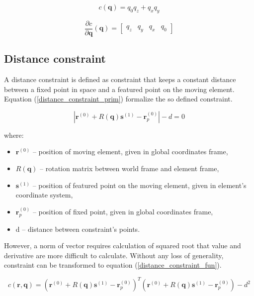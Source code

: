 \begin{equation}
	c \left( \bm{q} \right) = q_{0}q_{z}+q_{x}q_{y}
	\label{yaw_constraint_fun}
\end{equation}

\begin{equation}
	\frac{\partial c}{\partial \bm{q}}  \left( \bm{q} \right) =
	\begin{bmatrix}
	 q_{z} &  q_{y} &  q_{x} &  q_{0}
	\end{bmatrix}
	\label{yaw_constraint_fun_der}
\end{equation}

\subsection{Distance constraint}

A distance constraint is defined as constraint that keeps a constant distance between a fixed point in space and a featured point on the moving element. Equation (\ref{distance_constraint_prim}) formalize the so defined constraint.

\begin{equation}
	\left| \bm{r}^{(0)} + R(\bm{q})\bm{s}^{(1)} - \bm{r}_p^{(0)} \right| - d = 0
	\label{distance_constraint_prim}
\end{equation}

where:
\begin{itemize}
	\item $\bm{r}^{(0)}$ -- position of moving element, given in global coordinates frame,
	\item $R(\bm{q})$ -- rotation matrix between world frame and element frame,
	\item $\bm{s}^{(1)}$ -- position of featured point on the moving element, given in element's coordinate system,
	\item $\bm{r}_p^{(0)}$ -- position of fixed point, given in global coordinates frame,
	\item d -- distance between constraint's points.
\end{itemize}

However, a norm of vector requires calculation of squared root that value and derivative are more difficult to calculate. Without any loss of generality, constraint can be transformed to equation (\ref{distance_constraint_fun}).

\begin{equation}
	c(\bm{r}, \bm{q}) = \left( \bm{r}^{(0)} + R(\bm{q})\bm{s}^{(1)} - \bm{r}_p^{(0)} \right)^T \left( \bm{r}^{(0)} + R(\bm{q})\bm{s}^{(1)} - \bm{r}_p^{(0)} \right) - d^2
	\label{distance_constraint_fun}
\end{equation}

